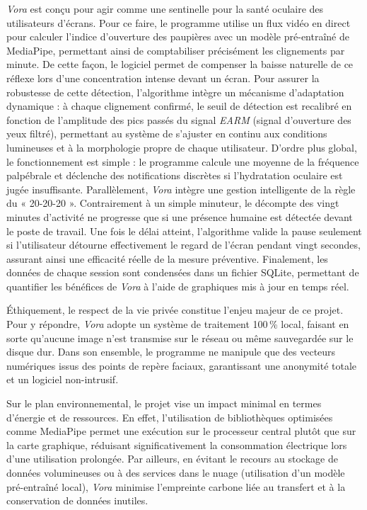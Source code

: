\documentclass{rapportbrebeuf}
\begin{document}
\textit{Vora} est conçu pour agir comme une sentinelle pour la santé oculaire des utilisateurs
d'écrans. Pour ce faire, le programme utilise un flux vidéo en direct pour calculer l'indice
d'ouverture des paupières avec un modèle pré-entraîné de MediaPipe, permettant ainsi de
comptabiliser précisément les clignements par minute. De cette façon, le logiciel permet de
compenser la baisse naturelle de ce réflexe lors d'une concentration intense devant un écran. Pour assurer la robustesse de cette détection, l'algorithme intègre un mécanisme d'adaptation dynamique : à chaque clignement confirmé, le seuil de détection est recalibré en fonction de l'amplitude des pics passés du signal \textit{EARM} (signal d'ouverture des yeux filtré), permettant au système de s'ajuster en continu aux conditions lumineuses et à la morphologie propre de chaque utilisateur. D'ordre plus global, le fonctionnement est simple : le programme calcule une moyenne de la fréquence palpébrale et déclenche des notifications discrètes si l'hydratation oculaire est jugée insuffisante.
Parallèlement, \textit{Vora} intègre une gestion intelligente de la règle du « 20-20-20 ».
Contrairement à un simple minuteur, le décompte des vingt minutes d'activité ne progresse que si
une présence humaine est détectée devant le poste de travail. Une fois le délai atteint, l'algorithme
valide la pause seulement si l'utilisateur détourne effectivement le regard de l'écran pendant vingt
secondes, assurant ainsi une efficacité réelle de la mesure préventive. Finalement, les données de
chaque session sont condensées dans un fichier SQLite, permettant de quantifier les
bénéfices de \textit{Vora} à l'aide de graphiques mis à jour en temps réel.

Éthiquement, le respect de la vie privée constitue l'enjeu majeur de ce projet. Pour y répondre,
\textit{Vora} adopte un système de traitement 100\,\% local, faisant en sorte qu'aucune image
n'est transmise sur le réseau ou même sauvegardée sur le disque dur. Dans son ensemble, le
programme ne manipule que des vecteurs numériques issus des points de repère faciaux,
garantissant une anonymité totale et un logiciel non-intrusif.

Sur le plan environnemental, le projet vise un impact minimal en termes d'énergie et de
ressources. En effet, l'utilisation de bibliothèques optimisées comme MediaPipe permet
une exécution sur le processeur central plutôt que sur la carte graphique, réduisant
significativement la consommation électrique lors d'une utilisation prolongée. Par ailleurs, en
évitant le recours au stockage de données volumineuses ou à des services dans le nuage
(utilisation d'un modèle pré-entraîné local), \textit{Vora} minimise l'empreinte carbone liée au
transfert et à la conservation de données inutiles. 
\end{document}
